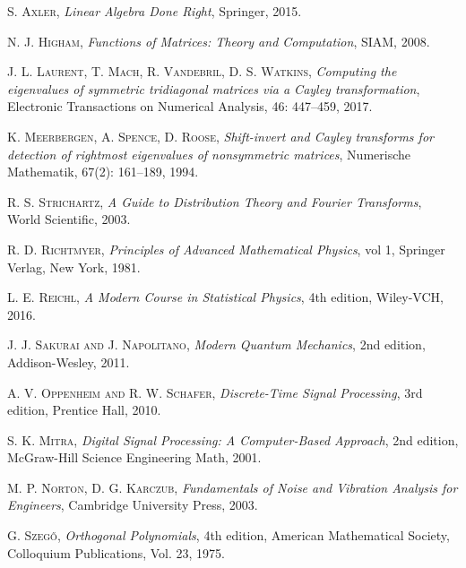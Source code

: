 
\begin{thebibliography}{56}

    \textsc{S. Axler},
    \textit{Linear Algebra Done Right},
    Springer,
    2015.

    \textsc{N. J. Higham},
    \textit{Functions of Matrices: Theory and Computation},
    SIAM,
    2008.

    \textsc{J. L. Laurent, T. Mach, R. Vandebril, D. S. Watkins},
    \textit{Computing the eigenvalues of symmetric tridiagonal matrices via a Cayley transformation},
    Electronic Transactions on Numerical Analysis, 46: 447--459,
    2017.

    \textsc{K. Meerbergen, A. Spence, D. Roose},
    \textit{Shift-invert and Cayley transforms for detection of rightmost eigenvalues of nonsymmetric matrices},
    Numerische Mathematik, 67(2): 161--189,
    1994.

    \textsc{R. S. Strichartz},
    \textit{A Guide to Distribution Theory and Fourier Transforms},
    World Scientific,
    2003.

    \textsc{R. D. Richtmyer},
    \textit{Principles of Advanced Mathematical Physics},
    vol 1, Springer Verlag,
    New York,
    1981.

    \textsc{L. E. Reichl},
    \textit{A Modern Course in Statistical Physics},
    4th edition,
    Wiley-VCH,
    2016.

    \textsc{J. J. Sakurai and J. Napolitano},
    \textit{Modern Quantum Mechanics},
    2nd edition,
    Addison-Wesley,
    2011.

    \textsc{A. V. Oppenheim and R. W. Schafer},
    \textit{Discrete-Time Signal Processing},
    3rd edition,
    Prentice Hall,
    2010.

    \textsc{S. K. Mitra},
    \textit{Digital Signal Processing: A Computer-Based Approach},
    2nd edition,
    McGraw-Hill Science Engineering Math,
    2001.

    \textsc{M. P. Norton, D. G. Karczub},
    \textit{Fundamentals of Noise and Vibration Analysis for Engineers},
    Cambridge University Press,
    2003.

    \textsc{G. Szeg\H{o}},
    \textit{Orthogonal Polynomials},
    4th edition,
    American Mathematical Society, Colloquium Publications, Vol. 23, 1975.


\end{thebibliography}
